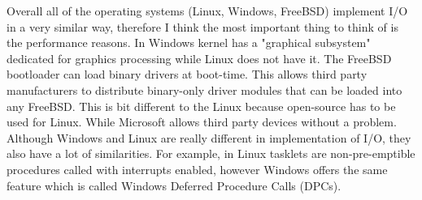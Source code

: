 \documentclass[letterpaper,10pt,draftclsnofoot,onecolumn]{IEEEtran}
\begin{document}
Overall all of the operating systems (Linux, Windows, FreeBSD) implement I/O in a very similar way, therefore I think the most important thing to think of is the performance reasons. In Windows kernel has a "graphical subsystem" dedicated for graphics processing while Linux does not have it. The FreeBSD bootloader can load binary drivers at boot-time. This allows third party manufacturers to distribute binary-only driver modules that can be loaded into any FreeBSD. This is bit different to the Linux because open-source has to be used for Linux. While Microsoft allows third party devices without a problem. Although Windows and Linux are really different in implementation of I/O, they also have a lot of similarities. For example, in Linux tasklets are non-pre-emptible procedures called with interrupts enabled, however Windows offers the same feature which is called Windows Deferred Procedure Calls (DPCs).
\end{document}
